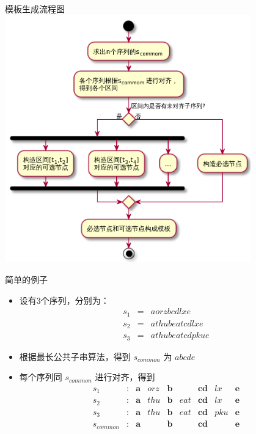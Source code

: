 \begin{frame}[label=sec-2-18]{模板生成流程图}
  \vspace{-2mm}
\includegraphics[width=0.8\textwidth]{subsystem}
\end{frame}

\begin{frame}[label=sec-2-19]{简单的例子}
\begin{itemize}
\item 设有3个序列，分别为：
\begin{eqnarray*}
s_1&=&aorzbcdlxe\\
s_2&=&athubeatcdlxe\\
s_3&=&athubeatcdpkue
\end{eqnarray*}
\item 根据最长公共子串算法，得到 $s_{common}$ 为 $abcde$
\item 每个序列同 $s_{common}$ 进行对齐，得到
\begin{displaymath}
\begin{matrix}
s_1      & : & \mathbf{a} & orz & \mathbf{b} &   & \mathbf{cd} &lx & \mathbf{e}\\
s_2      &:&\mathbf{a}&thu&\mathbf{b}&eat&\mathbf{cd}&lx&\mathbf{e}\\
s_3      &:&\mathbf{a}&thu&\mathbf{b}&eat&\mathbf{cd}&pku&\mathbf{e}\\
s_{common}&:&\mathbf{a}&   &\mathbf{b}&   &\mathbf{cd}&   &\mathbf{e}\\
\end{matrix}
\end{displaymath}
\end{itemize}
\end{frame}

